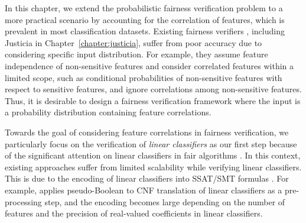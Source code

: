 	In this chapter, we extend the probabilistic fairness verification problem to a more practical scenario by accounting for the correlation of features, which is prevalent in most classification datasets. Existing fairness verifiers \cite{albarghouthi2017fairsquare,bastani2019probabilistic}, including Justicia \cite{ghosh2020justicia} in Chapter~\ref{chapter:justicia}, suffer from poor accuracy due to considering specific input distribution. For example, they assume feature independence of non-sensitive features and consider correlated features within a limited scope, such as conditional probabilities of non-sensitive features with respect to sensitive features, and ignore correlations among non-sensitive features. Thus, it is desirable to design a fairness verification framework where the input is a probability distribution containing feature correlations.
	
	Towards the goal of considering feature correlations in fairness verification, we particularly focus on the verification of \textit{linear classifiers} as our first step because of the significant attention on linear classifiers in fair algorithms \cite{pleiss2017fairness,zafar2017fairness,dressel2018accuracy, john2020verifying}. In this context, existing approaches suffer from limited scalability while verifying linear classifiers. This is due to the encoding of linear classifiers into SSAT/SMT formulas \cite{ghosh2020justicia,albarghouthi2017fairsquare}. For example, {\justicia} applies pseudo-Boolean to CNF translation of linear classifiers as a pre-processing step, and the encoding becomes large depending on the number of features and the precision of real-valued coefficients in linear classifiers.
	
